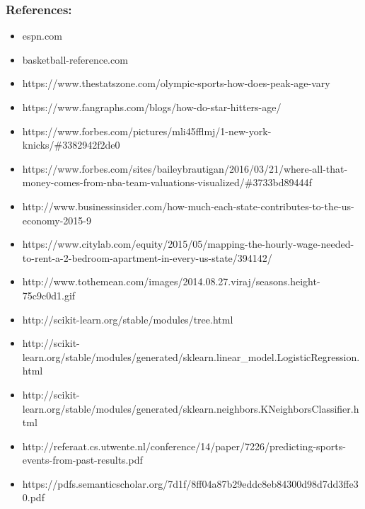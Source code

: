 \documentclass[11pt]{article}
\providecommand{\tightlist}{%
      \setlength{\itemsep}{0pt}\setlength{\parskip}{0pt}}
\begin{document}
    \subsubsection{References:}\label{references}

\begin{itemize}
\tightlist
\item
  espn.com
\item
  basketball-reference.com
\item
  https://www.thestatszone.com/olympic-sports-how-does-peak-age-vary
\item
  https://www.fangraphs.com/blogs/how-do-star-hitters-age/
\item
  https://www.forbes.com/pictures/mli45fflmj/1-new-york-knicks/\#3382942f2de0
\item
  https://www.forbes.com/sites/baileybrautigan/2016/03/21/where-all-that-money-comes-from-nba-team-valuations-visualized/\#3733bd89444f
\item
  http://www.businessinsider.com/how-much-each-state-contributes-to-the-us-economy-2015-9
\item
  https://www.citylab.com/equity/2015/05/mapping-the-hourly-wage-needed-to-rent-a-2-bedroom-apartment-in-every-us-state/394142/
\item
  http://www.tothemean.com/images/2014.08.27.viraj/seasons.height-75c9c0d1.gif
\item
  http://scikit-learn.org/stable/modules/tree.html
\item
  http://scikit-learn.org/stable/modules/generated/sklearn.linear\_model.LogisticRegression.html
\item
  http://scikit-learn.org/stable/modules/generated/sklearn.neighbors.KNeighborsClassifier.html
\item
  http://referaat.cs.utwente.nl/conference/14/paper/7226/predicting-sports-events-from-past-results.pdf
\item
  https://pdfs.semanticscholar.org/7d1f/8ff04a87b29eddc8eb84300d98d7dd3ffe30.pdf
\end{itemize}


    
    
    
    
\end{document}
